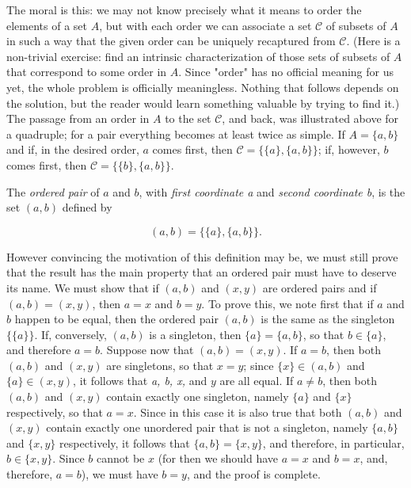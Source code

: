 The moral is this: we may not know precisely what it means to order the elements of a set $A$, but with each order we can associate a set $ \mathcal{C} $ of subsets of $A$ in such a way that the given order can be uniquely recaptured from $ \mathcal{C} $. (Here is a non-trivial exercise: find an intrinsic characterization of those sets of subsets of $A$ that correspond to some order in $A$. Since "order" has no official meaning for us yet, the whole problem is officially meaningless. Nothing that follows depends on the solution, but the reader would learn something valuable by trying to find it.) The passage from an order in $A$ to the set $ \mathcal{C} $, and back, was illustrated above for a quadruple; for a pair everything becomes at least twice as simple. If $ A = \{ a,b \}$ and if, in the desired order, $a$ comes first, then $ \mathcal{C} = \{ \{ a \} , \{ a,b \} \}$; if, however, $b$ comes first, then $ \mathcal{C} = \{ \{ b \}, \{a, b \}\}$. 

The \textit{ordered pair} of $a$ and $b$, with \textit{first coordinate a} and \textit{second coordinate b}, is the set $(a, b)$ defined by 

\begin{equation*}
(a, b) = \{ \{a \} , \{ a, b \} \}.
\end{equation*}

However convincing the motivation of this definition may be, we must still prove that the result has the main property that an ordered pair must have to deserve its name. We must show that if $(a,b)$ and $(x, y)$ are ordered pairs and if $(a,b) = (x,y)$, then $ a = x $ and $b = y$. To prove this, we note first that if $a$ and $b$ happen to be equal, then the ordered pair $(a,b)$ is the same as the singleton $ \{ \{ a \} \} $. If, conversely, $(a,b)$ is a singleton, then $ \{ a \} =  \{ a , b \}$, so that $ b \in \{ a \} $, and therefore $a = b$. Suppose now that $ (a, b) = (x, y)$. If $ a = b $, then both $(a, b)$ and $(x,y)$ are singletons, so that $ x = y $; since $ \{ x \} \in (a,b)$ and $ \{ a \} \in (x,y)$, it follows that \textit{a, b, x,} and $y$ are all equal. If $a \neq b$, then both $(a, b)$ and $(x, y)$ contain exactly one singleton, namely $ \{a \}$ and $ \{ x \} $ respectively, so that $a = x$. Since in this case it is also true that both $(a,b)$ and $(x, y)$ contain exactly one unordered pair that is not a singleton, namely $ \{a, b \}$ and $ \{ x, y \}$ respectively, it follows that $ \{ a, b \} = \{ x,y \} $, and therefore, in particular, $b \in \{ x,y \} $. Since $b$ cannot be $x$ (for then we should have $ a = x $ and $ b = x $, and, therefore, $ a = b $), we must have $b = y $, and the proof is complete. 

